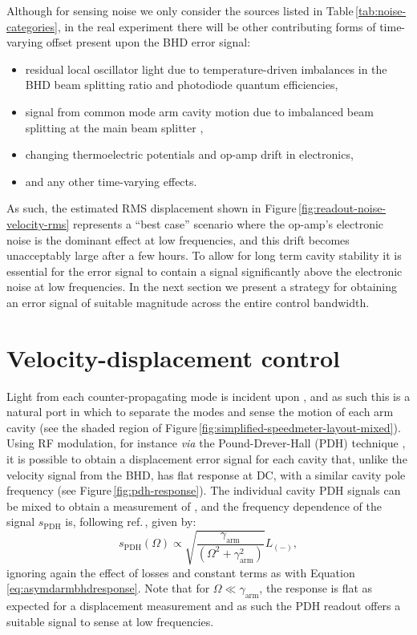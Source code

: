 Although for sensing noise we only consider the sources listed in Table\,\ref{tab:noise-categories}, in the real experiment there will be other contributing forms of time-varying offset present upon the \gls{BHD} error signal:
\begin{itemize}
  \item residual local oscillator light due to temperature-driven imbalances in the \gls{BHD} beam splitting ratio and photodiode quantum efficiencies,
  \item signal from common mode arm cavity motion due to imbalanced beam splitting at the main beam splitter \cite{Danilishin2015},
  \item changing thermoelectric potentials and op-amp drift in electronics,
  \item and any other time-varying effects.
\end{itemize}
As such, the estimated \gls{RMS} displacement shown in Figure\,\ref{fig:readout-noise-velocity-rms} represents a ``best case'' scenario where the op-amp's electronic noise is the dominant effect at low frequencies, and this drift becomes unacceptably large after a few hours. To allow for long term cavity stability it is essential for the error signal to contain a signal significantly above the electronic noise at low frequencies. In the next section we present a strategy for obtaining an error signal of suitable magnitude across the entire control bandwidth.
 
\section{\label{sec:mixed-control}Velocity-displacement control}
Light from each counter-propagating mode is incident upon \MNINE{}, and as such this is a natural port in which to separate the modes and sense the motion of each arm cavity (see the shaded  region of Figure\,\ref{fig:simplified-speedmeter-layout-mixed}). Using \gls{RF} modulation, for instance \emph{via} the Pound-Drever-Hall (\gls{PDH}) technique \cite{Drever1983}, it is possible to obtain a displacement error signal for each cavity that, unlike the velocity signal from the \gls{BHD}, has flat response at \gls{DC}, with a similar cavity pole frequency (see Figure\,\ref{fig:pdh-response}). The individual cavity \gls{PDH} signals can be mixed to obtain a measurement of \LMINUS{}, and the frequency dependence of the signal $s_{\textrm{PDH}}$ is, following ref.\,\cite{Kimble2001}, given by:
\begin{equation}
  \label{eq:m9darmpdhresponse}
  s_{\textrm{PDH}} \left( \Omega \right) \propto \sqrt{\frac{\gamma_{\textrm{arm}}}{\left(\Omega^2 + \gamma_{\textrm{arm}}^2 \right)}} L_{\left(-\right)},
\end{equation}
ignoring again the effect of losses and constant terms as with Equation \ref{eq:asymdarmbhdresponse}. Note that for $\Omega \ll \gamma_{\textrm{arm}}$, the response is flat as expected for a displacement measurement and as such the PDH readout offers a suitable signal to sense \LMINUS{} at low frequencies.

